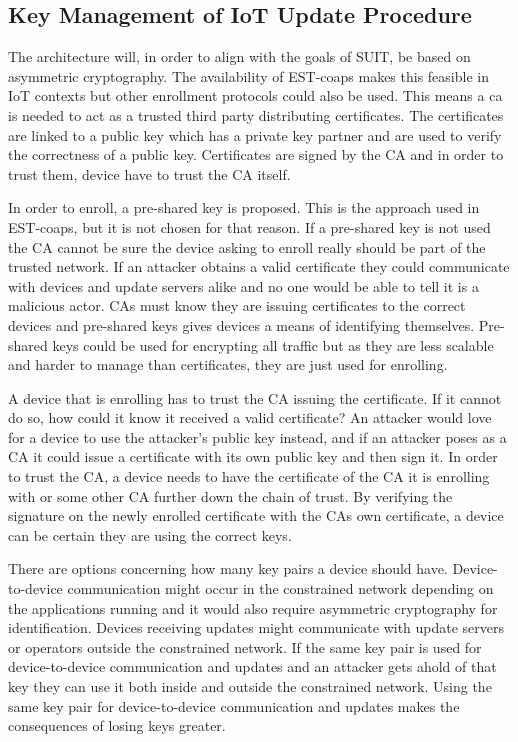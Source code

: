 \documentclass[0-thesis.tex]{subfiles}
\begin{document}
\subsection{Key Management of IoT Update Procedure}
\label{ssec:key-management}
The architecture will, in order to align with the goals of SUIT, be based on asymmetric
cryptography. The availability of EST-coaps makes this feasible in IoT contexts but other
enrollment protocols could also be used. This means a \gls{ca} is needed to act as a
trusted third party distributing certificates. The certificates are linked to a public key
which has a private key partner and are used to verify the correctness of a public key.
Certificates are signed by the CA and in order to trust them, device have to trust the CA
itself.

In order to enroll, a pre-shared key is proposed. This is the approach used in EST-coaps,
but it is not chosen for that reason. If a pre-shared key is not used the CA cannot be
sure the device asking to enroll really should be part of the trusted network. If an
attacker obtains a valid certificate they could communicate with devices and update
servers alike and no one would be able to tell it is a malicious actor. CAs must know they
are issuing certificates to the correct devices and pre-shared keys gives devices a means
of identifying themselves. Pre-shared keys could be used for encrypting all traffic but as
they are less scalable and harder to manage than certificates, they are just used for
enrolling.

A device that is enrolling has to trust the CA issuing the certificate. If it cannot do
so, how could it know it received a valid certificate? An attacker would love for a device
to use the attacker's public key instead, and if an attacker poses as a CA it could issue
a certificate with its own public key and then sign it. In order to trust the CA, a device
needs to have the certificate of the CA it is enrolling with or some other CA further down
the chain of trust. By verifying the signature on the newly enrolled certificate with the
CAs own certificate, a device can be certain they are using the correct keys.

There are options concerning how many key pairs a device should have. Device-to-device
communication might occur in the constrained network depending on the applications running
and it would also require asymmetric cryptography for identification. Devices receiving
updates might communicate with update servers or operators outside the constrained
network. If the same key pair is used for device-to-device communication and updates and
an attacker gets ahold of that key they can use it both inside and outside the constrained
network. Using the same key pair for device-to-device communication and updates makes the
consequences of losing keys greater. 
\end{document}
